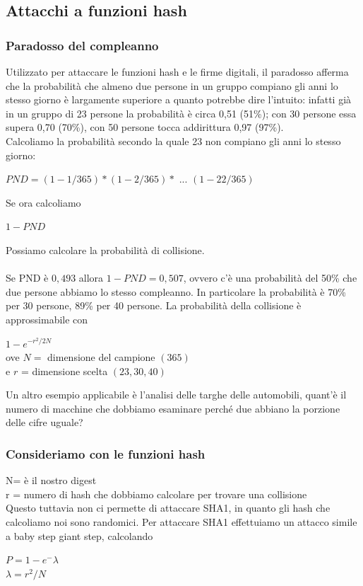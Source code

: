 \documentclass[11pt, oneside]{article}   	%
\begin{document}
\subsection*{Attacchi a funzioni hash}
\subsubsection*{Paradosso del compleanno}
Utilizzato per attaccare le funzioni hash e le firme digitali, il paradosso afferma che la probabilità che almeno due persone in un gruppo compiano gli anni lo stesso giorno è largamente superiore a quanto potrebbe dire l'intuito: infatti già in un gruppo di 23 persone la probabilità è circa 0,51 (51\%); con 30 persone essa supera 0,70 (70\%), con 50 persone tocca addirittura 0,97 (97\%). \\
Calcoliamo la probabilità secondo la quale 23 non compiano gli anni lo stesso giorno:
\begin{center}
$PND = (1 - 1/365) * (1-2/365)*$ $...$ $(1-22/365)$
\end{center}
Se ora calcoliamo \begin{center}
$1-PND$
\end{center}
Possiamo calcolare la probabilità di collisione.\\\\
Se PND è $0,493$ allora $1 - PND = 0,507$, ovvero c'è una probabilità del 50\% che due persone abbiamo lo stesso compleanno. In particolare la probabilità è 70\% per 30 persone, 89\% per 40 persone. La probabilità della collisione è approssimabile con \begin{center}
$1 - e^{-r^2/2N}$\\
ove $N =$ dimensione del campione $(365)$\\
e $r$ = dimensione scelta $(23, 30, 40)$
\end{center}
Un altro esempio applicabile è l'analisi delle targhe delle automobili, quant'è il numero di macchine che dobbiamo esaminare perché due abbiano la porzione delle cifre uguale?
\subsubsection*{Consideriamo con le funzioni hash}
N= è il nostro digest\\
r = numero di hash che dobbiamo calcolare per trovare una collisione\\
Questo tuttavia non ci permette di attaccare SHA1, in quanto gli hash che calcoliamo noi sono randomici. Per attaccare SHA1 effettuiamo un attacco simile a baby step giant step, calcolando
\begin{center}
$P = 1 - e^-\lambda$\\
$\lambda = r^2/N$
\end{center}
\end{document}
